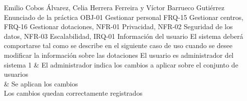 {Emilio Cobos Álvarez, Celia Herrera Ferreira y Víctor Barrueco Gutiérrez}
{Enunciado de la práctica}
{OBJ-01 Gestionar personal}
{FRQ-15 Gestionar centros, FRQ-16 Gestionar dotaciones, NFR-01 Privacidad, NFR-02 Seguridad de los datos, NFR-03 Escalabilidad, IRQ-01 Información del usuario}
{El sistema deberá comportarse tal como se describe en el siguiente caso de uso cuando se desee modificar la información sobre las dotaciones}
{El usuario es administrador del sistema}
{
1 & El administrador indica los cambios a aplicar sobre el conjunto de usuarios \\  & Se aplican los cambios \\
}
{Los cambios quedan correctamente registrados}
{}

